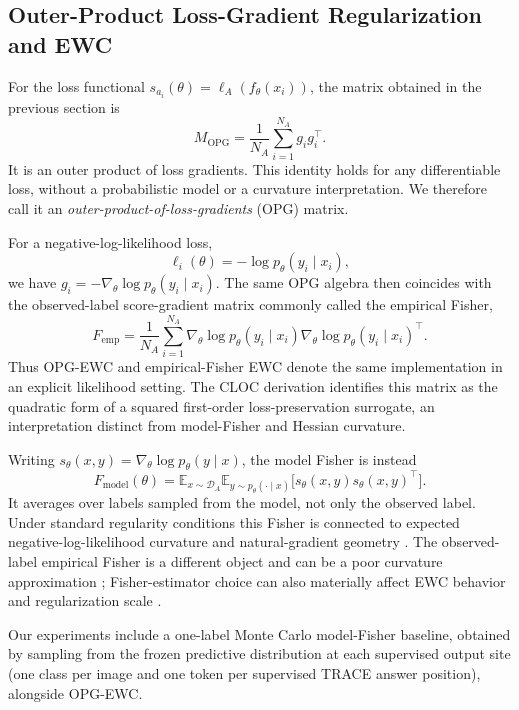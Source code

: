 \subsection{Outer-Product Loss-Gradient Regularization and EWC}

For the loss functional $s_{a_i}(\theta)=\ell_A(f_\theta(x_i))$, the matrix obtained in the previous section is
\[
M_{\mathrm{OPG}}
=
\frac{1}{N_A}\sum_{i=1}^{N_A}g_i g_i^\top.
\]
It is an outer product of loss gradients. This identity holds for any differentiable loss, without a probabilistic model or a curvature interpretation. We therefore call it an \emph{outer-product-of-loss-gradients} (OPG) matrix.

For a negative-log-likelihood loss,
\[
\ell_i(\theta)=-\log p_\theta(y_i\mid x_i),
\]
we have $g_i=-\nabla_\theta\log p_\theta(y_i\mid x_i)$. The same OPG algebra then coincides with the observed-label score-gradient matrix commonly called the empirical Fisher,
\[
F_{\mathrm{emp}}
=
\frac{1}{N_A}\sum_{i=1}^{N_A}
\nabla_\theta\log p_\theta(y_i\mid x_i)
\nabla_\theta\log p_\theta(y_i\mid x_i)^\top.
\]
Thus OPG-EWC and empirical-Fisher EWC denote the same implementation in an explicit likelihood setting. The CLOC derivation identifies this matrix as the quadratic form of a squared first-order loss-preservation surrogate, an interpretation distinct from model-Fisher and Hessian curvature.

Writing $s_\theta(x,y)=\nabla_\theta\log p_\theta(y\mid x)$, the model Fisher is instead
\[
F_{\mathrm{model}}(\theta)
=\mathbb E_{x\sim\mathcal D_A}
\mathbb E_{y\sim p_\theta(\cdot\mid x)}
\bigl[s_\theta(x,y)s_\theta(x,y)^\top\bigr].
\]
It averages over labels sampled from the model, not only the observed label. Under standard regularity conditions this Fisher is connected to expected negative-log-likelihood curvature and natural-gradient geometry \citep{Amari1998,MartensNG,KFAC}. The observed-label empirical Fisher is a different object and can be a poor curvature approximation \citep{KunstnerEF}; Fisher-estimator choice can also materially affect EWC behavior and regularization scale \citep{VanDeVenFisher2025}.

Our experiments include a one-label Monte Carlo model-Fisher baseline, obtained by sampling from the frozen predictive distribution at each supervised output site (one class per image and one token per supervised TRACE answer position), alongside OPG-EWC.
